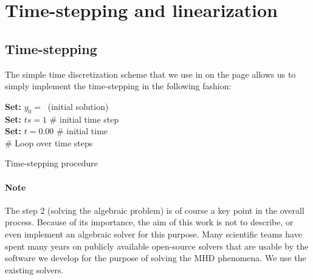 \section{Time-stepping and linearization}

\subsection{Time-stepping}
The simple time discretization scheme that we use in  on the page \pageref{section:discreteProblem} allows us to simply implement the time-stepping in the following fashion:\\
\begin{algorithm}[H]
\textbf{    Set: }$y_0 =\ $ (initial solution)\\
\textbf{    Set: }$ts = 1 $ \# initial time step\\
\textbf{    Set: }$t = 0.00 $ \# initial time\\
    \# Loop over time steps\\
    \caption{Time-stepping procedure}
\label{algorithm:timeStepping}
\end{algorithm}
\paragraph{Note}
\label{note:solvers}
The step 2 (solving the algebraic problem) is of course a key point in the overall process. Because of its importance, the aim of this work is not to describe, or even implement an algebraic solver for this purpose. Many scientific teams have spent many years on publicly available open-source solvers that are usable by the software we develop for the purpose of solving the MHD phenomena. We use the existing solvers.